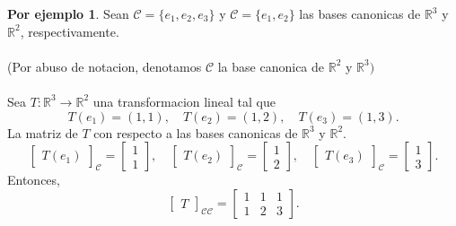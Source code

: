 \documentclass{article}
\theoremstyle{definition}
\theoremstyle{definition}
\newtheorem*{ej}{Por ejemplo}
\theoremstyle{remark}
\begin{document}
\begin{ej}
  Sean $\mathcal{C}=\{e_1, e_2, e_3\}$ y $\mathcal{C} = \{e_1, e_2\}$ las bases canonicas de $\mathbb{R}^3$ y $\mathbb{R}^2$, respectivamente. \\\\(Por abuso de notacion, denotamos $\mathcal{C}$ la base canonica de $\mathbb{R}^2$ y $\mathbb{R}^3)$\\\\ Sea $T : \mathbb{R}^3 \to \mathbb{R}^2$ una transformacion lineal tal que \[
T(e_1)=(1,1), \quad T(e_2)=(1,2), \quad T(e_3) = (1,3).
  \]
  La matriz de $T$ con respecto a las bases canonicas de $\mathbb{R}^3$ y $\mathbb{R}^2$. \[
    \begin{bmatrix} T (e_1) \end{bmatrix}_{\mathcal{C}}=\begin{bmatrix} 1 \\ 1 \end{bmatrix}, \quad \begin{bmatrix} T (e_2) \end{bmatrix}_{\mathcal{C}}=\begin{bmatrix} 1 \\ 2 \end{bmatrix}, \quad  \begin{bmatrix} T (e_3) \end{bmatrix}_{\mathcal{C}}=\begin{bmatrix} 1 \\ 3 \end{bmatrix}.
  \]
  Entonces, \[
    \begin{bmatrix}T \end{bmatrix}_{\mathcal{C} \mathcal{C}} = \begin{bmatrix} 1 & 1 & 1 \\ 1 & 2 & 3 \end{bmatrix}.
  \]
\end{ej}
\end{document}
